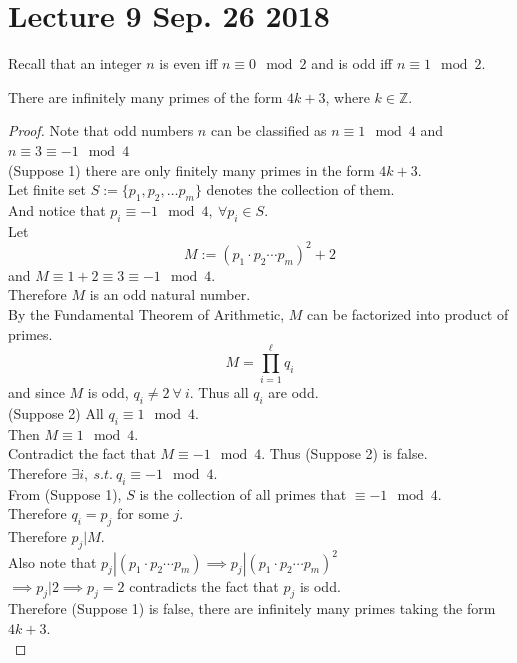 \documentclass[10pt]{article}
\begin{document}
	\section{Lecture 9 Sep. 26 2018}
	\begin{remark}
		Recall that an integer $n$ is even iff $n \equiv 0 \mod 2$ and is odd iff $n \equiv 1 \mod 2$.
	\end{remark}
	
	\begin{theorem}
		There are infinitely many primes of the form $4k+3$, where $k \in \mathbb{Z}$.
	\end{theorem}
	\begin{proof}
		Note that odd numbers $n$ can be classified as $n \equiv 1 \mod 4$ and $n \equiv 3 \equiv -1\mod 4$ \\
		(Suppose 1) there are only finitely many primes in the form $4k+3$. \\
		Let finite set $S := \{p_1, p_2, \dots p_m\}$ denotes the collection of them. \\
		And notice that $p_i \equiv -1 \mod 4,\ \forall p_i \in S$. \\
		Let 
		\[
			M := (p_1 \cdot p_2 \cdots p_m)^2 + 2
		\]
		and $M \equiv 1 + 2 \equiv 3 \equiv -1 \mod 4$. \\
		Therefore $M$ is an odd natural number. \\
		By the Fundamental Theorem of Arithmetic, $M$ can be factorized into product of primes.\\
		\[
			M = \prod_{i=1}^{\ell} q_i
		\]
		and since $M$ is odd, $q_i \neq 2\ \forall \ i$. Thus all $q_i$ are odd.\\
		(Suppose 2) All $q_i \equiv 1 \mod 4$. \\
		Then $M \equiv 1 \mod 4$. \\
		Contradict the fact that $M \equiv -1 \mod 4$. Thus (Suppose 2) is false. \\
		Therefore $\exists i,\ s.t.\ q_i \equiv -1 \mod 4$. \\
		From (Suppose 1), $S$ is the collection of all primes that $\equiv -1 \mod 4$. \\
		Therefore $q_i = p_j$ for some $j$. \\
		Therefore $p_j | M$.\\
		Also note that $p_j | (p_1 \cdot p_2 \cdots p_m) \implies p_j | (p_1 \cdot p_2 \cdots p_m)^2$ \\
		$\implies p_j | 2 \implies p_j = 2$ contradicts the fact that $p_j$ is odd. \\
		Therefore (Suppose 1) is false, there are infinitely many primes taking the form $4k+3$. \\
	\end{proof}
	
\end{document}
